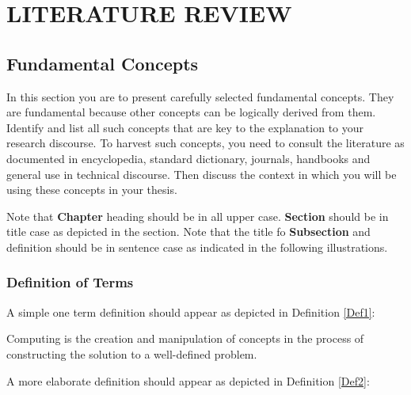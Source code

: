 \chapter{\large LITERATURE REVIEW}
\thispagestyle{empty}

\section{Fundamental Concepts}
In this section you are to present carefully selected fundamental concepts. They are fundamental because other concepts can be logically derived from them.  Identify and list all such concepts that are key to the explanation to your research discourse. To harvest such concepts, you need to consult  the literature as documented in encyclopedia, standard dictionary, journals, handbooks and general use in technical discourse. Then discuss the context in which you will be using these concepts in your thesis.


Note that \textbf{Chapter} heading should be in all upper case. \textbf{Section} should be in title case as depicted in the section. Note that the title fo \textbf{Subsection} and definition should be in sentence case as indicated in the following illustrations.


 
\subsection{Definition of Terms}


A simple one term definition should appear as depicted in Definition \ref{Def1}:

\begin{definition}[Computing]
Computing is the creation and manipulation of concepts in the process of constructing the solution to a well-defined problem.	
\label{Def1}
\end{definition}

%

A more elaborate definition should appear as depicted in Definition \ref{Def2}:

